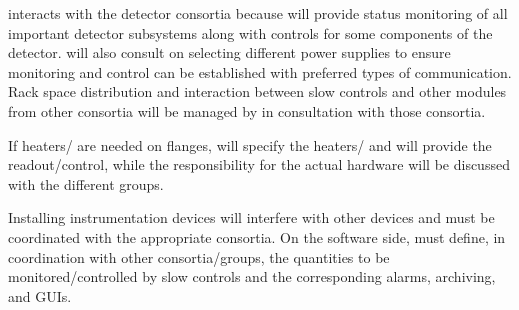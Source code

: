   interacts with the detector consortia because  will provide status monitoring of all important detector subsystems along with controls for some components of the detector.
 will also consult on selecting different power supplies to ensure monitoring and control can be established with preferred types of communication. 
Rack space distribution and interaction between slow controls and other modules from other consortia will be managed by  in consultation with those consortia. 

If heaters/ are needed on flanges,  will specify the heaters/ and will provide the readout/control, while the responsibility for the actual hardware will be discussed with the different groups.  

Installing instrumentation devices will interfere with other devices and must be coordinated with the appropriate consortia.  
On the software side,  must define, in coordination with other consortia/groups, the quantities to be monitored/controlled by slow controls and the corresponding alarms,
archiving, and GUIs. 

